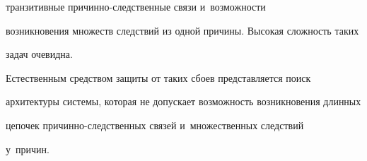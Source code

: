 транзитивные при\-чин\-но-след\-ст\-вен\-ные связи и~возможности 


возникновения множеств следствий из одной причины. Высокая слож\-ность таких 


задач оче\-видна.


  


  Естественным средством защиты от таких сбоев пред\-став\-ля\-ет\-ся поиск 


архитектуры сис\-те\-мы, которая не допускает воз\-мож\-ность возникновения длинных 


цепочек при\-чин\-но-след\-ст\-вен\-ных связей и~множественных следствий 


у~при\-чин.


  


